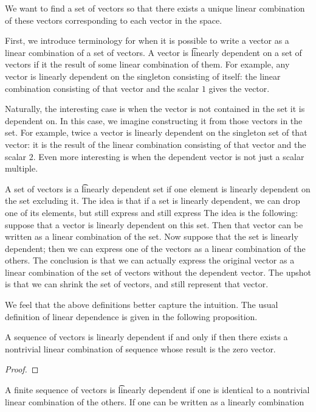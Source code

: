 

We want to find a set of vectors so that there exists a unique linear combination of these vectors corresponding to each vector in the space.


First, we introduce terminology for when it is possible to write a vector as a linear combination of a set of vectors.
A vector is \t{linearly dependent} on a set of vectors if it the result of some linear combination of them.
For example, any vector is linearly dependent on the singleton consisting of itself:
the linear combination consisting of that vector and the scalar $1$ gives the vector.

Naturally, the interesting case is when the vector is not contained in the set it is dependent on.
In this case, we imagine constructing it from those vectors in the set.
For example, twice a vector is linearly dependent on the singleton set of that vector: it is the result of the linear combination consisting of that vector and the scalar $2$.
Even more interesting is when the dependent vector is not just a scalar multiple.

A set of vectors is a \t{linearly dependent set} if one element is linearly dependent on the set excluding it.
The idea is that if a set is linearly dependent, we can drop one of its elements, but still express and still express
The idea is the following: suppose that a vector is linearly dependent on this set.
Then that vector can be written as a linear combination of the set.
Now suppose that the set is linearly dependent; then we can express one of the vectors as a linear combination of the others.
The conclusion is that we can actually express the original vector as a linear combination of the set of vectors without the dependent vector.
The upshot is that we can shrink the set of vectors, and still represent that vector.

We feel that the above definitions better capture the intuition.
The usual definition of linear dependence is given in the following proposition.
\begin{prop}
  A sequence of vectors is linearly dependent if and only if then there exists a nontrivial linear combination of sequence whose result is the zero vector.
  \begin{proof}

  \end{proof}

\end{prop}
A finite sequence of vectors is \t{linearly dependent} if one is identical to a nontrivial linear combination of the others.
If one can be written as a linearly combination

